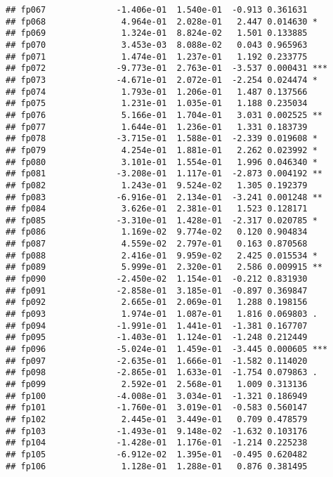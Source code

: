 \documentclass[
]{article}
\begin{document}
\begin{verbatim}
## fp067              -1.406e-01  1.540e-01  -0.913 0.361631    
## fp068               4.964e-01  2.028e-01   2.447 0.014630 *  
## fp069               1.324e-01  8.824e-02   1.501 0.133885    
## fp070               3.453e-03  8.088e-02   0.043 0.965963    
## fp071               1.474e-01  1.237e-01   1.192 0.233775    
## fp072              -9.773e-01  2.763e-01  -3.537 0.000431 ***
## fp073              -4.671e-01  2.072e-01  -2.254 0.024474 *  
## fp074               1.793e-01  1.206e-01   1.487 0.137566    
## fp075               1.231e-01  1.035e-01   1.188 0.235034    
## fp076               5.166e-01  1.704e-01   3.031 0.002525 ** 
## fp077               1.644e-01  1.236e-01   1.331 0.183739    
## fp078              -3.715e-01  1.588e-01  -2.339 0.019608 *  
## fp079               4.254e-01  1.881e-01   2.262 0.023992 *  
## fp080               3.101e-01  1.554e-01   1.996 0.046340 *  
## fp081              -3.208e-01  1.117e-01  -2.873 0.004192 ** 
## fp082               1.243e-01  9.524e-02   1.305 0.192379    
## fp083              -6.916e-01  2.134e-01  -3.241 0.001248 ** 
## fp084               3.626e-01  2.381e-01   1.523 0.128171    
## fp085              -3.310e-01  1.428e-01  -2.317 0.020785 *  
## fp086               1.169e-02  9.774e-02   0.120 0.904834    
## fp087               4.559e-02  2.797e-01   0.163 0.870568    
## fp088               2.416e-01  9.959e-02   2.425 0.015534 *  
## fp089               5.999e-01  2.320e-01   2.586 0.009915 ** 
## fp090              -2.450e-02  1.154e-01  -0.212 0.831930    
## fp091              -2.858e-01  3.185e-01  -0.897 0.369847    
## fp092               2.665e-01  2.069e-01   1.288 0.198156    
## fp093               1.974e-01  1.087e-01   1.816 0.069803 .  
## fp094              -1.991e-01  1.441e-01  -1.381 0.167707    
## fp095              -1.403e-01  1.124e-01  -1.248 0.212449    
## fp096              -5.024e-01  1.459e-01  -3.445 0.000605 ***
## fp097              -2.635e-01  1.666e-01  -1.582 0.114020    
## fp098              -2.865e-01  1.633e-01  -1.754 0.079863 .  
## fp099               2.592e-01  2.568e-01   1.009 0.313136    
## fp100              -4.008e-01  3.034e-01  -1.321 0.186949    
## fp101              -1.760e-01  3.019e-01  -0.583 0.560147    
## fp102               2.445e-01  3.449e-01   0.709 0.478579    
## fp103              -1.493e-01  9.148e-02  -1.632 0.103176    
## fp104              -1.428e-01  1.176e-01  -1.214 0.225238    
## fp105              -6.912e-02  1.395e-01  -0.495 0.620482    
## fp106               1.128e-01  1.288e-01   0.876 0.381495    

\end{verbatim}
\end{document}
